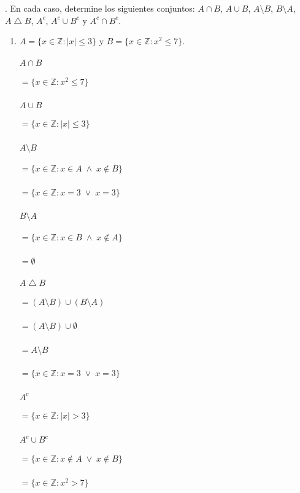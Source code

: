 \section{}
. En cada caso, determine los siguientes conjuntos: $A \cap B$, $A \cup B$, $A \setminus B$, $B \setminus A$, $A \bigtriangleup B$, $A^c$, $A^c \cup B^c$ y $A^c \cap B^c$.\\

\begin{enumerate}
\renewcommand{\labelenumi}{(\alph{enumi})} \item $A = \{x \in \mathbb{Z} : |x| \leq 3\}$ y $B = \{x \in \mathbb{Z} : x^2 \leq 7\}$.
\paragraph{$A \cap B$}
	\subparagraph{$ = \{x \in \mathbb{Z} : x^2 \leq 7\}$}
\paragraph{$A \cup B$}
	\subparagraph{$ = \{x \in \mathbb{Z} : |x| \leq 3\}$}
\paragraph{$A \setminus B$}
	\subparagraph{$ = \{x \in \mathbb{Z} : x \in A \; \wedge \; x \notin B\}$}
	\subparagraph{$ = \{x \in \mathbb{Z} : x=3 \; \vee \; x=3\}$}
\paragraph{$B \setminus A$}
	\subparagraph{$ = \{x \in \mathbb{Z} : x \in B \; \wedge \; x \notin A\}$}
	\subparagraph{$= \emptyset$}
\paragraph{$A \bigtriangleup B$}
	\subparagraph{$ = (A \setminus B) \cup (B \setminus A) $}
	\subparagraph{$ = (A \setminus B) \cup \emptyset $}\newpage
	\subparagraph{$ = A \setminus B $}
	\subparagraph{$ = \{x \in \mathbb{Z} : x=3 \; \vee \; x=3\}$}
\paragraph{$A^c$}
	\subparagraph{$ = \{x \in \mathbb{Z} : |x| > 3\}$}
\paragraph{$A^c \cup B^c$}
	\subparagraph{$ = \{x \in \mathbb{Z} : x \notin A \; \vee \; x \notin B\}$}
	\subparagraph{$ = \{x \in \mathbb{Z} : x^2 > 7\}$}

\end{enumerate}
